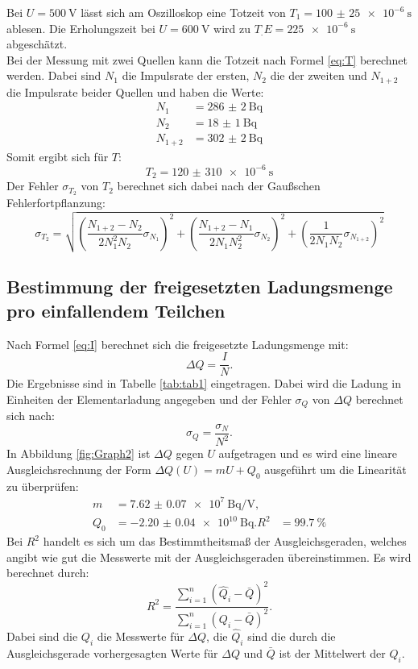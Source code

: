 Bei $U=\SI{500}{\volt}$ lässt sich am Oszilloskop eine Totzeit von $T_1=\SI{100(25)e-6}{\second}$ ablesen. Die Erholungszeit bei $U=\SI{600}{\volt}$ wird zu $T_.E=\SI{225e-6}{\second}$ abgeschätzt.\\
Bei der Messung mit zwei Quellen kann die Totzeit nach Formel \eqref{eq:T} berechnet werden. Dabei sind $N_1$ die Impulsrate der ersten, $N_2$ die der zweiten und $N_{1+2}$ die Impulsrate beider Quellen und haben die Werte:
\begin{align*}
N_1 	&= \SI{286(2)}{\becquerel}\\
N_2 	&= \SI{18(1)}{\becquerel}\\
N_{1+2}	&= \SI{302(2)}{\becquerel}
\end{align*} 
Somit ergibt sich für $T$:
\begin{equation*}
T_2 = \SI{120(310)e-6}{\second}
\end{equation*}
Der Fehler $\sigma_{T_2}$ von $T_2$ berechnet sich dabei nach der Gaußschen Fehlerfortpflanzung:
\begin{equation}
\sigma_{T_2} = \sqrt{\left(\frac{N_{1+2}-N_2}{2N_1^2N_2}\sigma_{N_1}\right)^2+\left(\frac{N_{1+2}-N_1}{2N_1N_2^2}\sigma_{N_2}\right)^2+\left(\frac{1}{2N_1N_2}\sigma_{N_{1+2}}\right)^2}
\end{equation}



\subsection{Bestimmung der freigesetzten Ladungsmenge pro einfallendem Teilchen}

Nach Formel \eqref{eq:I} berechnet sich die freigesetzte Ladungsmenge mit:
\begin{equation*}
\Delta Q = \frac{I}{N} \text{.}
\end{equation*}
Die Ergebnisse sind in Tabelle \ref{tab:tab1} eingetragen. Dabei wird die Ladung in Einheiten der Elementarladung angegeben und der Fehler $\sigma_Q$ von $\Delta Q$ berechnet sich nach:
\begin{equation*}
\sigma_Q = \frac{\sigma_N}{N^2} \text{.}
\end{equation*}
In Abbildung \ref{fig:Graph2} ist $\Delta Q$ gegen $U$ aufgetragen und es wird eine lineare Ausgleichsrechnung der Form $\Delta Q(U) = mU+Q_0$ ausgeführt um die Linearität zu überprüfen:
\begin{align*}
m 	&= \SI{7.62(7)e7}{\becquerel\per\volt} \text{,}\\
Q_0	&= \SI{-2.20(4)e10}{\becquerel}\text{.}
R^2 &= \SI{99.7}{\%}
\end{align*}   
Bei $R^2$ handelt es sich um das Bestimmtheitsmaß der Ausgleichsgeraden, welches angibt wie gut die Messwerte mit der Ausgleichsgeraden übereinstimmen. Es wird berechnet durch:
\begin{equation*}
R^2 = \frac{\sum_{i=1}^n\left(\hat{Q}_i-\bar{Q}\right)^2}{\sum_{i=1}^n\left(Q_i-\bar{Q}\right)^2} \text{.}
\end{equation*}
Dabei sind die $Q_i$ die Messwerte für $\Delta Q$, die $\hat{Q}_i$ sind die durch die Ausgleichsgerade vorhergesagten Werte für $\Delta Q$ und $\bar{Q}$ ist der Mittelwert der $Q_i$.  

